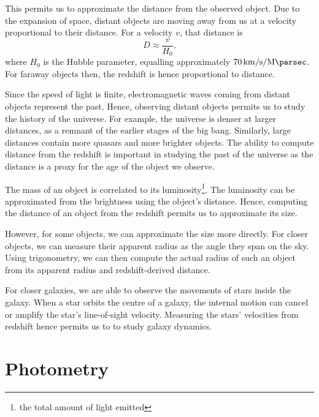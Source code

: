 \documentclass[11pt,twoside]{report}
\begin{document}
  This permits us to approximate the distance from the observed object. Due to the expansion of space, distant objects are moving away from us at a velocity proportional to their distance. For a velocity $v$, that distance is \[
      D \approx \frac{v}{H_0} \text{,}
  \] where $H_0$ is the Hubble parameter, equalling approximately $\SI{70}{\kilo\meter\per\second\per\mega\parsec}$. For faraway objects then, the redshift is hence proportional to distance.

  Since the speed of light is finite, electromagnetic waves coming from distant objects represent the past. Hence, observing distant objects permits us to study the history of the universe. For example, the universe is denser at larger distances, as a remnant of the earlier stages of the big bang. Similarly, large distances contain more quasars and more brighter objects. The ability to compute distance from the redshift is important in studying the past of the universe as the distance is a proxy for the age of the object we observe.

  The mass of an object is correlated to its luminosity\footnote{the total amount of light emitted}. The luminosity can be approximated from the brightness using the object's distance. Hence, computing the distance of an object from the redshift permits us to approximate its size.

  However, for some objects, we can approximate the size more directly. For closer objects, we can measure their apparent radius as the angle they span on the sky. Using trigonometry, we can then compute the actual radius of such an object from its apparent radius and redshift-derived distance.

  For closer galaxies, we are able to observe the movements of stars inside the galaxy. When a star orbits the centre of a galaxy, the internal motion can cancel or amplify the star's line-of-sight velocity. Measuring the stars' velocities from redshift hence permits us to to study galaxy dynamics.

\chapter{Photometry}
\end{document}
